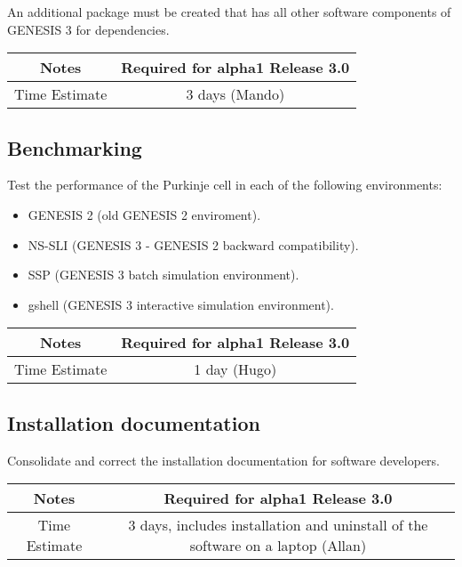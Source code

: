 \documentclass[12pt]{article}
\begin{document}
An additional package must be created that has all other software
components of GENESIS 3 for dependencies.

{
  \vspace{5mm}
  \centering
  \begin{tabular}{|c|c|}
    \hline
    Notes
    & Required for alpha1 Release 3.0 \\
    \hline
    Time Estimate
    & 3 days (Mando) \\
    \hline
  \end{tabular}
}



\subsection{Benchmarking}

Test the performance of the Purkinje cell in each of the following
environments:

\begin{itemize}
\item GENESIS 2 (old GENESIS 2 enviroment).
\item NS-SLI (GENESIS 3 - GENESIS 2 backward compatibility).
\item SSP (GENESIS 3 batch simulation environment).
\item gshell (GENESIS 3 interactive simulation environment).
\end{itemize}

{
  \vspace{5mm}
  \centering
  \begin{tabular}{|c|c|}
    \hline
    Notes
    & Required for alpha1 Release 3.0 \\
    \hline
    Time Estimate
    & 1 day (Hugo) \\
    \hline
  \end{tabular}
}



\subsection{Installation documentation}

Consolidate and correct the installation documentation for software
developers.

{
  \vspace{5mm}
  \centering
  \begin{tabular}{|c|c|}
    \hline
    Notes
    & Required for alpha1 Release 3.0 \\
    \hline
    Time Estimate
    & 3 days, includes installation and uninstall of the software on a laptop (Allan) \\
    \hline
  \end{tabular}
}
\end{document}
